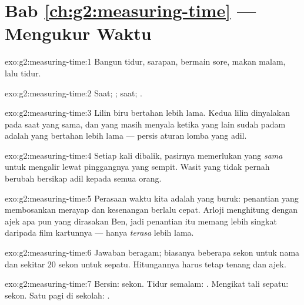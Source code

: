 \section*{Bab \ref{ch:g2:measuring-time} --- Mengukur Waktu}

\begin{solution}{exo:g2:measuring-time:1}
Bangun tidur, sarapan, bermain sore, makan malam, lalu tidur.
\end{solution}

\begin{solution}{exo:g2:measuring-time:2}
Saat; ; saat; .
\end{solution}

\begin{solution}{exo:g2:measuring-time:3}
Lilin biru bertahan lebih lama. Kedua lilin dinyalakan pada saat yang
sama, dan yang masih menyala ketika yang lain sudah padam adalah yang
bertahan lebih lama --- persis aturan lomba yang adil.
\end{solution}

\begin{solution}{exo:g2:measuring-time:4}
Setiap kali dibalik, pasirnya memerlukan  yang \emph{sama}
untuk mengalir lewat pinggangnya yang sempit. Wasit yang tidak pernah
berubah bersikap adil kepada semua orang.
\end{solution}

\begin{solution}{exo:g2:measuring-time:5}
Perasaan waktu kita adalah  yang buruk: penantian yang membosankan
merayap dan kesenangan berlalu cepat. Arloji menghitung dengan ajek
apa pun yang dirasakan Ben, jadi penantian itu memang lebih singkat
daripada film kartunnya --- hanya \emph{terasa} lebih lama.
\end{solution}

\begin{solution}{exo:g2:measuring-time:6}
Jawaban beragam; biasanya beberapa sekon untuk nama dan sekitar $20$
sekon untuk sepatu. Hitungannya harus tetap tenang dan ajek.
\end{solution}

\begin{solution}{exo:g2:measuring-time:7}
Bersin: sekon. Tidur semalam: . Mengikat tali sepatu: sekon. Satu
pagi di sekolah: .
\end{solution}

